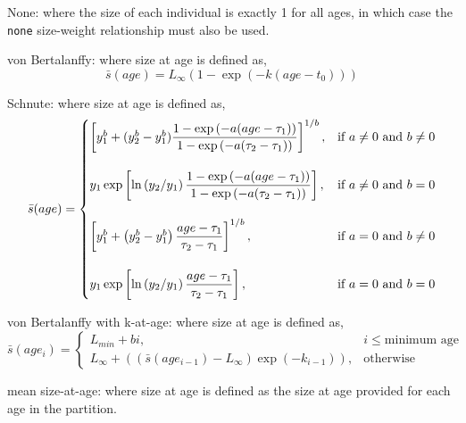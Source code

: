 \begin{description}
\item {None:} where the size of each individual is exactly 1 for all ages, in which case the \texttt{none} size-weight relationship must also be used.
\item{von Bertalanffy:} where size at age is defined as,
\begin{equation} 
\bar{s}(age)= L_\infty \left( 1 - \exp \left( -k \left(age-t_0 \right) \right) \right)
\end{equation}

\item{Schnute:} where size at age is defined as,
\begin{equation}
\bar{s}(age)=\displaystyle\begin{cases}
  \left[ y_1^b + (y_2^b - y_1^b) \dfrac{1-\exp \left(-a(age - \tau_1) \right)}{1-\exp \left(-a(\tau_2 - \tau_1) \right)} \right]^{1/b}, & \text{if $a\ne0$ and $b\ne0$} \\
  \AddVspace
  y_1 \exp \left[ \ln \left( y_2 / y_1 \right) \dfrac{1-\exp \left(-a(age - \tau_1) \right)}{1-\exp \left(-a(\tau_2 - \tau_1) \right)} \right], & \text{if $a\ne0$ and $b=0$} \\
  \AddVspace
  \left[ y_1^b + \left( y_2^b - y_1^b \right) \dfrac{age-\tau_1}{\tau_2 - \tau_1} \right]^{1/b}, & \text{if $a=0$ and $b\ne0$} \\
  \AddVspace
  y_1 \exp \left[ \ln \left( y_2/y_1 \right) \dfrac{age-\tau_1}{\tau_2 - \tau_1} \right] , & \text{if $a=0$ and $b=0$} \\
  \end{cases}
\end{equation}

\item{von Bertalanffy with k-at-age:} where size at age is defined as,
\begin{equation} 
\bar{s}(age_i)=\displaystyle\begin{cases}
L_{min} + b i, & i \le \text{minimum age} \\
L_\infty + \left( (\bar{s}(age_{i-1}) - L_\infty) \exp(-k_{i-1}) \right), & \text{otherwise}
\end{cases}
\end{equation}

\item{mean size-at-age:} where size at age is defined as the size at age provided for each age in the partition.
\end{description}

